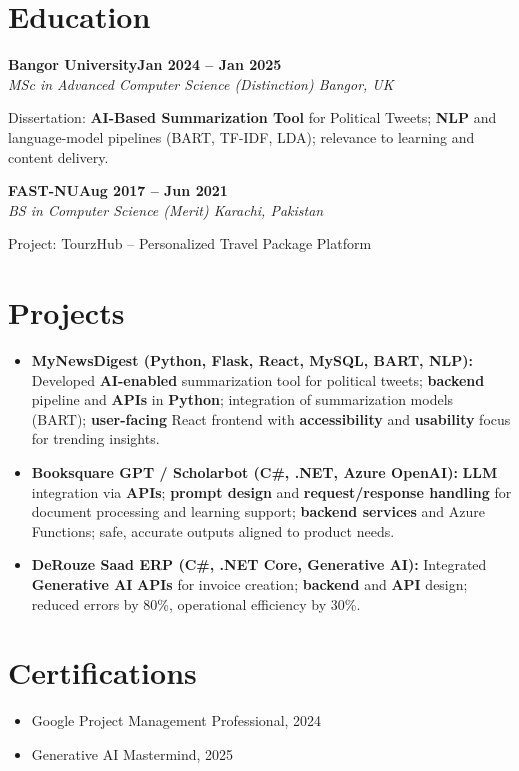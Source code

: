 \documentclass[letterpaper,10pt]{article}
\newcommand{\headingBf}[2]{
  \hspace{10pt}\textbf{#1}\hfill\textbf{#2}\\
}
\newcommand{\headingIt}[2]{
  \hspace{10pt}\textit{#1}\hfill\textit{#2}\\
}
\newenvironment{resume_list}{
  \vspace{-7pt}
  \begin{itemize}[itemsep=-2px, parsep=1pt, leftmargin=30pt]
}{
  \end{itemize}
}
\begin{document}
\section{Education}

\headingBf{Bangor University}{Jan 2024 -- Jan 2025}
\headingIt{MSc in Advanced Computer Science (Distinction) \hfill Bangor, UK}{}
\begin{resume_list}
    \item Dissertation: \textbf{AI-Based Summarization Tool} for Political Tweets; \textbf{NLP} and language-model pipelines (BART, TF-IDF, LDA); relevance to learning and content delivery.
\end{resume_list}

\headingBf{FAST-NU}{Aug 2017 -- Jun 2021}
\headingIt{BS in Computer Science (Merit) \hfill Karachi, Pakistan}{}
\begin{resume_list}
    \item Project: TourzHub -- Personalized Travel Package Platform
\end{resume_list}

\section{Projects}
\begin{itemize}
    \setlength\itemsep{3pt}
    \item \textbf{MyNewsDigest (\textbf{Python}, \textbf{Flask}, React, MySQL, BART, NLP):} Developed \textbf{AI-enabled} summarization tool for political tweets; \textbf{backend} pipeline and \textbf{APIs} in \textbf{Python}; integration of summarization models (BART); \textbf{user-facing} React frontend with \textbf{accessibility} and \textbf{usability} focus for trending insights.
    \item \textbf{Booksquare GPT / Scholarbot (C\#, .NET, \textbf{Azure OpenAI}):} \textbf{LLM} integration via \textbf{APIs}; \textbf{prompt design} and \textbf{request/response handling} for document processing and learning support; \textbf{backend services} and Azure Functions; safe, accurate outputs aligned to product needs.
    \item \textbf{DeRouze Saad ERP (C\#, .NET Core, \textbf{Generative AI}):} Integrated \textbf{Generative AI} \textbf{APIs} for invoice creation; \textbf{backend} and \textbf{API} design; reduced errors by 80\%, operational efficiency by 30\%.
\end{itemize}

\section{Certifications}
\begin{itemize}
    \item Google Project Management Professional, 2024
    \item Generative AI Mastermind, 2025
\end{itemize}

\vspace*{\fill}
\end{document}
